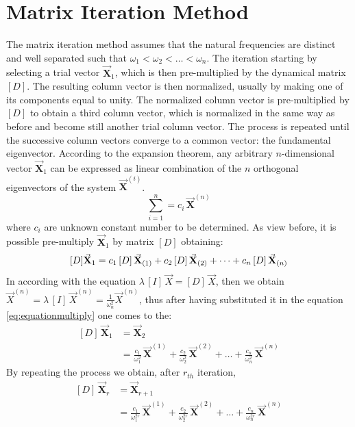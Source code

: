 \section{Matrix Iteration Method}\label{sec:mim}
The matrix iteration method assumes that the natural frequencies are distinct
and well separated such that \(\omega_1 < \omega_2 < \dots < \omega_n\).
The iteration starting by selecting a trial vector \(\vec{\mathbf{X}}_{1}\),
which is then pre-multiplied by the dynamical matrix \([D]\).
The resulting column vector is then normalized, usually by making one of its
components equal to unity.
The normalized column vector is pre-multiplied by \([D]\) to obtain a third
column vector, which is normalized in the same way as before and become still
another trial column vector.
The process is repeated until the successive column vectors converge to a common
vector: the fundamental eigenvector.
According to the expansion theorem, any arbitrary \(n\)-dimensional vector
\(\vec{\mathbf{X}}_{1}\) can be expressed as linear combination of the \(n\)
orthogonal eigenvectors of the system \(\vec{\mathbf{X}}^{(i)}\).
\begin{equation}\label{eq:expasniontheorem}
	\sum_{i = 1}^{n} = c_{i}\,\vec{\mathbf{X}}^{(n)}
\end{equation}
where \(c_{i}\) are unknown constant number to be determined.
As view before, it is possible pre-multiply \(\vec{\mathbf{X}}_{1}\) by matrix
\([D]\) obtaining:
\begin{equation}\label{eq:equationmultiply}
	[D] \vec{\mathbf{X}}_{1} = 	c_{1}\, [D] \,\vec{\mathbf{X}}_{(1)} +
								c_{2}\, [D] \,\vec{\mathbf{X}}_{(2)} + \dots +
  							c_{n}\, [D] \,\vec{\mathbf{X}}_{(n)}\\
\end{equation}
In according with the equation \(\lambda\,[I]\,\vec{X} = [D]\,\vec{X}\), then
we obtain
\(\vec{X}^{(n)} = \lambda\,[I]\,\vec{X}^{(n)} = \frac{1}{\omega^{2}_{n}}
\vec{X}^{(n)}\), thus after having substituted it in the equation
\eqref{eq:equationmultiply} one comes to the:
\begin{align}\label{eq:equationsubs}
  	[D]\,\vec{\mathbf{X}}_{1} &= \vec{\mathbf{X}}_{2}\\[0.75em]
      						&= \frac{c_{1}}{\omega^{2}_{1}}\,\vec{\mathbf{X}}^{(1)} +
		\frac{c_{2}}{\omega^{2}_{2}}\,\vec{\mathbf{X}}^{(2)} + \dots +
		\frac{c_{n}}{\omega^{2}_{n}}\,\vec{\mathbf{X}}^{(n)}
\end{align}
By repeating the process we obtain, after \(r_{th}\) iteration,
\begin{align}\label{eq:equationrth}
  	[D]\,\vec{\mathbf{X}}_{r} &= \vec{\mathbf{X}}_{r+1}\\[0.75em]
      						&= \frac{c_{1}}{\omega^{2r}_{1}}\,\vec{\mathbf{X}}^{(1)} +
		\frac{c_{2}}{\omega^{2r}_{2}}\,\vec{\mathbf{X}}^{(2)} + \dots +
		\frac{c_{n}}{\omega^{2r}_{n}}\,\vec{\mathbf{X}}^{(n)}
\end{align}
